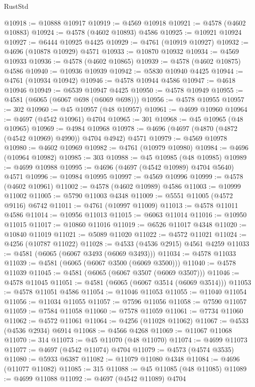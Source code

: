 \begin{lexlean}{RustStd}
\begin{coremodule}
@10918 := @10888 @10917
@10919 := @4569 @10918
@10921 := @4578 (@4602 @10883)
@10924 := @4578 (@4602 @10893) @4586
@10925 := @10921 @10924
@10927 := @6444 @10925 @4425
@10929 := @4761 (@10919 @10927)
@10932 := @4696 (@10878 @10929) @4571
@10933 := @10870 @10932
@10934 := @4569 @10933
@10936 := @4578 (@4602 @10865)
@10939 := @4578 (@4602 @10875) @4586
@10940 := @10936 @10939
@10942 := @5830 @10940 @4425
@10944 := @4761 (@10934 @10942)
@10946 := @4578 @10944 @4586
@10947 := @4618 @10946
@10949 := @6539 @10947 @4425
@10950 := @4578 @10949
@10955 := @4581 (@6065 (@6067 @698 (@6069 @698)))
@10956 := @4578 @10955
@10957 := 302
@10960 := @45 @10957 (@48 @10957)
@10961 := @4699 @10960
@10964 := @4697 (@4542 @10961) @4704
@10965 := 301
@10968 := @45 @10965 (@48 @10965)
@10969 := @4984 @10968
@10978 := @4696 (@4697 (@4870 (@4872 (@4542 @10969) @4990)) @4704 @4942) @4571
@10979 := @4569 @10978
@10980 := @4602 @10969
@10982 := @4761 (@10979 @10980)
@10984 := @4696 (@10964 @10982)
@10985 := 303
@10988 := @45 @10985 (@48 @10985)
@10989 := @4699 @10988
@10995 := @4696 (@4697 (@4542 @10989) @4704 @5640) @4571
@10996 := @10984 @10995
@10997 := @4569 @10996
@10999 := @4578 (@4602 @10961)
@11002 := @4578 (@4602 @10989) @4586
@11003 := @10999 @11002
@11005 := @5790 @11003 @4348
@11009 := @5551 @11005 (@4572 @9116) @6742
@11011 := @4761 (@10997 @11009)
@11013 := @4578 @11011 @4586
@11014 := @10956 @11013
@11015 := @6063 @11014
@11016 := @10950 @11015
@11017 := @10860 @11016
@11019 := @6526 @11017 @4348
@11020 := @10840 @11019
@11021 := @5089 @11020
@11022 := @4572 @11021
@11024 := @4256 (@10787 @11022)
@11028 := @4533 (@4536 @2915) @4561 @4259
@11033 := @4581 (@6065 (@6067 @3493 (@6069 @3493)))
@11034 := @4578 @11033
@11039 := @4581 (@6065 (@6067 @3500 (@6069 @3500)))
@11040 := @4578 @11039
@11045 := @4581 (@6065 (@6067 @3507 (@6069 @3507)))
@11046 := @4578 @11045
@11051 := @4581 (@6065 (@6067 @3514 (@6069 @3514)))
@11053 := @4578 @11051 @4586
@11054 := @11046 @11053
@11055 := @11040 @11054
@11056 := @11034 @11055
@11057 := @7596 @11056
@11058 := @7590 @11057
@11059 := @7584 @11058
@11060 := @7578 @11059
@11061 := @7734 @11060
@11062 := @4572 @11061
@11064 := @4256 (@11028 @11062)
@11067 := @4533 (@4536 @2934) @6914
@11068 := @4566 @4268
@11069 := @11067 @11068
@11070 := 314
@11073 := @45 @11070 (@48 @11070)
@11074 := @4699 @11073
@11077 := @4697 (@4542 @11074) @4704
@11079 := @4573 (@4574 @3535)
@11080 := @5933 @6387
@11082 := @11079 @11080 @4348
@11084 := @4696 (@11077 @11082)
@11085 := 315
@11088 := @45 @11085 (@48 @11085)
@11089 := @4699 @11088
@11092 := @4697 (@4542 @11089) @4704

\end{coremodule}
\end{lexlean}
